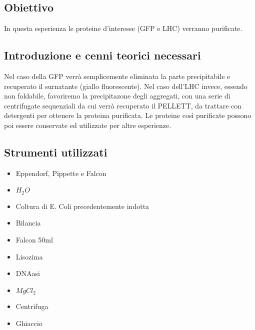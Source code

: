 \documentclass{extarticle}
\begin{document}
\subsection*{Obiettivo}
In questa esperienza le proteine d'interesse (GFP e LHC) verranno purificate.
\subsection*{Introduzione e cenni teorici necessari}
Nel caso della GFP verrà semplicemente eliminata la parte precipitabile e recuperato il surnatante (giallo fluorescente). Nel caso dell'LHC invece, essendo non foldabile, favoriremo la precipitazone degli aggregati, con una serie di centrifugate sequenziali da cui verrà recuperato il PELLETT, da trattare con detergenti per ottenere la proteina purificata.
Le proteine così purificate possono poi essere conservate ed utilizzate per altre
esperienze.
\subsection*{Strumenti utilizzati}
\begin{itemize}
    \item Eppendorf, Pippette e Falcon
    \item $H_{2}O$
    \item Coltura di E. Coli precedentemente indotta
    \item Bilancia
    \item Falcon 50ml
    \item Lisozima
    \item DNAasi
    \item $MgCl_{2}$
    \item Centrifuga
    \item Ghiaccio
\end{itemize}
\end{document}
